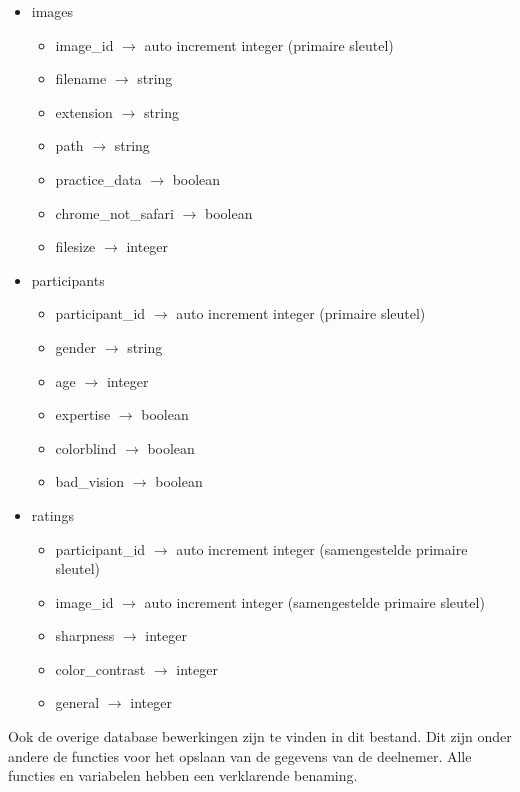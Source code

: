 \begin{itemize}
	
	\item images
	\begin{itemize}
		\item image\_id $\rightarrow$ auto increment integer (primaire sleutel)
		\item filename $\rightarrow$ string 
		\item extension $\rightarrow$ string 
		\item path $\rightarrow$ string 
		\item practice\_data $\rightarrow$ boolean 
		\item chrome\_not\_safari $\rightarrow$ boolean
		\item filesize $\rightarrow$ integer
	\end{itemize}

	\item participants
	\begin{itemize}
		\item participant\_id $\rightarrow$ auto increment integer (primaire sleutel)
		\item gender $\rightarrow$ string 
		\item age $\rightarrow$ integer 
		\item expertise $\rightarrow$ boolean 
		\item colorblind $\rightarrow$ boolean 
		\item bad\_vision $\rightarrow$ boolean
	\end{itemize}

	\item ratings
	\begin{itemize}
		\item participant\_id $\rightarrow$ auto increment integer (samengestelde primaire sleutel)
		\item image\_id $\rightarrow$ auto increment integer (samengestelde primaire sleutel)
		\item sharpness $\rightarrow$ integer 
		\item color\_contrast $\rightarrow$ integer 
		\item general $\rightarrow$ integer
	\end{itemize}

\end{itemize}

Ook de overige database bewerkingen zijn te vinden in dit bestand. Dit zijn onder andere de functies voor het opslaan van de gegevens van de deelnemer. Alle functies en variabelen hebben een verklarende benaming.

